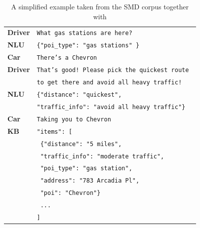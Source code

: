 \begin{table}[h]
    \centering
    \begin{tabular}{l|l}
    \toprule
         \textbf{Driver} & \texttt{What {\color{cyan!80!yellow!80!black!100}gas stations} are here?} \\
         \textbf{NLU} & \texttt{\{"poi\_type": "{\color{cyan!80!yellow!80!black!100}gas stations}" \}} \\
         \textbf{Car} & \texttt{There's a Chevron} \\
         \textbf{Driver} & \texttt{That's good! Please pick the {\color{cyan!80!yellow!80!black!100}quickest} route }\\ & \texttt{to get there and {\color{orange!50!yellow!90!black!100!}avoid all heavy traffic}!} \\
         \textbf{NLU} & \texttt{\{"distance": "{\color{cyan!80!yellow!80!black!100}quickest}",} \\
            & \texttt{"traffic\_info": "{\color{orange!50!yellow!90!black!100!}avoid all heavy traffic}"\} }\\
         \textbf{Car} & \texttt{Taking you to Chevron} \\
         \midrule
         \textbf{KB} & \texttt{"items": [} \\
          & \texttt{    \{"distance": "5 miles",} \\
          & \texttt{    "traffic\_info": "moderate traffic",} \\
          & \texttt{    "poi\_type": "gas station",} \\
          & \texttt{    "address": "783 Arcadia Pl",} \\
          & \texttt{    "poi": "Chevron"\}} \\
          & \texttt{    ...} \\
          & \texttt{]} \\
          \bottomrule
    \end{tabular}
    \caption{A simplified example taken from the SMD corpus together with }
    \label{02:tab:smd_example}
\end{table}


